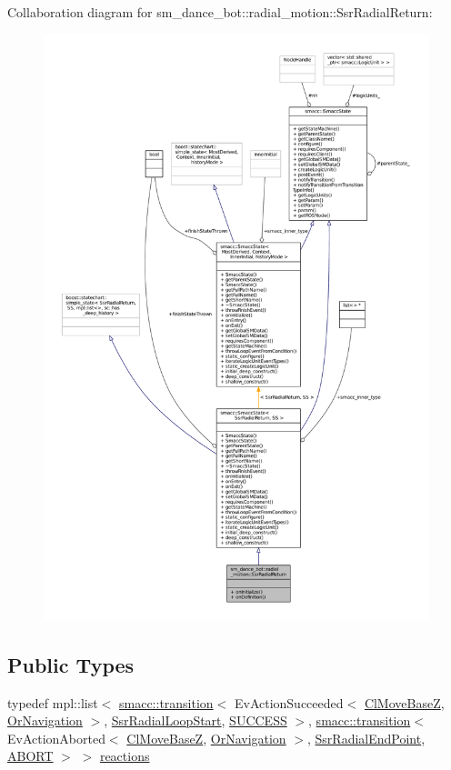 Collaboration diagram for sm\+\_\+dance\+\_\+bot\+:\+:radial\+\_\+motion\+:\+:Ssr\+Radial\+Return\+:
\nopagebreak
\begin{figure}[H]
\begin{center}
\leavevmode
\includegraphics[width=350pt]{structsm__dance__bot_1_1radial__motion_1_1SsrRadialReturn__coll__graph}
\end{center}
\end{figure}
\subsection*{Public Types}
\begin{DoxyCompactItemize}
\item 
typedef mpl\+::list$<$ \hyperlink{classsmacc_1_1transition}{smacc\+::transition}$<$ Ev\+Action\+Succeeded$<$ \hyperlink{classmove__base__z__client_1_1ClMoveBaseZ}{Cl\+Move\+BaseZ}, \hyperlink{classsm__dance__bot_1_1OrNavigation}{Or\+Navigation} $>$, \hyperlink{structsm__dance__bot_1_1radial__motion_1_1SsrRadialLoopStart}{Ssr\+Radial\+Loop\+Start}, \hyperlink{classSUCCESS}{S\+U\+C\+C\+E\+SS} $>$, \hyperlink{classsmacc_1_1transition}{smacc\+::transition}$<$ Ev\+Action\+Aborted$<$ \hyperlink{classmove__base__z__client_1_1ClMoveBaseZ}{Cl\+Move\+BaseZ}, \hyperlink{classsm__dance__bot_1_1OrNavigation}{Or\+Navigation} $>$, \hyperlink{structsm__dance__bot_1_1radial__motion_1_1SsrRadialEndPoint}{Ssr\+Radial\+End\+Point}, \hyperlink{classABORT}{A\+B\+O\+RT} $>$ $>$ \hyperlink{structsm__dance__bot_1_1radial__motion_1_1SsrRadialReturn_a8e7b5d74ffc81873d1e8d7b95e54d626}{reactions}
\end{DoxyCompactItemize}
